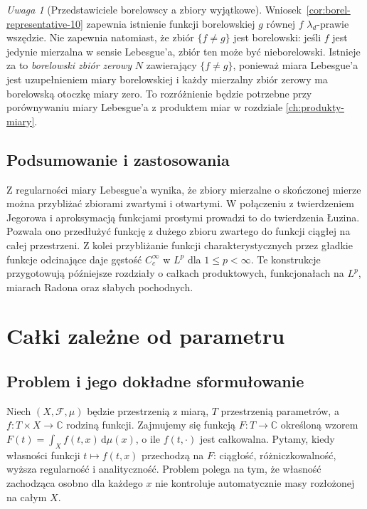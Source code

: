 \documentclass[11pt,a4paper,oneside]{book}
\numberwithin{equation}{chapter}
\theoremstyle{plain}
\theoremstyle{definition}
\theoremstyle{remark}
\newtheorem{uwaga}[twierdzenie]{Uwaga}
\begin{document}
\begin{uwaga}[Przedstawiciele borelowscy a zbiory wyjątkowe]
\label{rem:borel-null-representatives-10}
Wniosek~\ref{cor:borel-representative-10} zapewnia
istnienie funkcji borelowskiej $g$ równej $f$
$\lambda_d$-prawie wszędzie. Nie zapewnia natomiast,
że zbiór $\{f\ne g\}$ jest borelowski: jeśli $f$
jest jedynie mierzalna w sensie Lebesgue'a,
zbiór ten może być nieborelowski. Istnieje za to
\emph{borelowski zbiór zerowy} $N$ zawierający
$\{f\ne g\}$, ponieważ miara Lebesgue'a jest
uzupełnieniem miary borelowskiej i każdy mierzalny
zbiór zerowy ma borelowską otoczkę miary zero.
To rozróżnienie będzie potrzebne przy porównywaniu
miary Lebesgue'a z produktem miar w rozdziale
\ref{ch:produkty-miary}.
\end{uwaga}

\section{Podsumowanie i zastosowania}

Z regularności miary Lebesgue'a wynika, że zbiory
mierzalne o skończonej mierze można przybliżać
zbiorami zwartymi i otwartymi. W połączeniu z
twierdzeniem Jegorowa i aproksymacją funkcjami
prostymi prowadzi to do twierdzenia Łuzina.
Pozwala ono przedłużyć funkcję z dużego zbioru
zwartego do funkcji ciągłej na całej przestrzeni.
Z kolei przybliżanie funkcji charakterystycznych
przez gładkie funkcje odcinające daje gęstość
$C_c^\infty$ w $L^p$ dla $1\le p<\infty$.
Te konstrukcje przygotowują późniejsze rozdziały
o całkach produktowych, funkcjonałach na $L^p$,
miarach Radona oraz słabych pochodnych.



\chapter{Całki zależne od parametru}
\label{ch:parametry-calki}

\section{Problem i jego dokładne sformułowanie}

Niech $(X,\mathcal F,\mu)$ będzie przestrzenią z miarą, $T$ przestrzenią
parametrów, a $f:T\times X\to\mathbb C$ rodziną funkcji. Zajmujemy się
funkcją $F:T\to\mathbb C$ określoną wzorem
$F(t)=\int_X f(t,x)\,\mathrm d\mu(x)$, o ile $f(t,\cdot)$ jest całkowalna.
Pytamy, kiedy własności funkcji $t\mapsto f(t,x)$ przechodzą na $F$:
ciągłość, różniczkowalność, wyższa regularność i analityczność. Problem
polega na tym, że własność zachodząca osobno dla każdego $x$ nie
kontroluje automatycznie masy rozłożonej na całym $X$.
\end{document}
